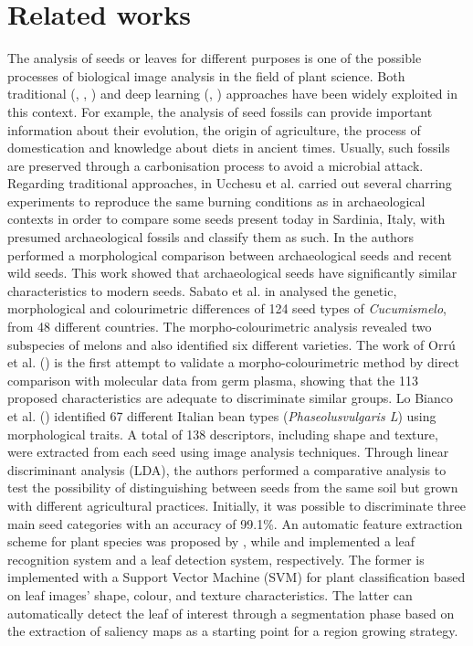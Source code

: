 \documentclass[twocolumn]{svjour3}           %
\begin{document}
\section{Related works}
\label{sec:related}
The analysis of seeds or leaves for different purposes is one of the possible processes of biological image analysis in the field of plant science. Both traditional (\cite{Campanile19}, \cite{DiRub2014}, \cite{Put16}) and deep learning (\cite{Zhang2019}, \cite{Loddo2021}) approaches have been widely exploited in this context. For example, the analysis of seed fossils can provide important information about their evolution, the origin of agriculture, the process of domestication and knowledge about diets in ancient times. Usually, such fossils are preserved through a carbonisation process to avoid a microbial attack.
Regarding traditional approaches, in \cite{Ucc2016} Ucchesu et al. carried out several charring experiments to reproduce the same burning conditions as in archaeological contexts in order to compare some seeds present today in Sardinia, Italy, with presumed archaeological fossils and classify them as such.
In \cite{Ucc2015} the authors performed a morphological comparison between archaeological seeds and recent wild seeds. This work showed that archaeological seeds have significantly similar characteristics to modern seeds. Sabato et al. in \cite{Sabato2015} analysed the genetic, morphological and colourimetric differences of 124 seed types of \emph{Cucumismelo}, from 48 different countries. The morpho-colourimetric analysis revealed two subspecies of melons and also identified six different varieties. The work of Orr\'u et al. (\cite{Orru2012}) is the first attempt to validate a morpho-colourimetric method by direct comparison with molecular data from germ plasma, showing that the 113 proposed characteristics are adequate to discriminate similar groups. Lo Bianco et al. (\cite{LoBianco2015}) identified 67 different Italian bean types (\emph{Phaseolusvulgaris L}) using morphological traits. A total of 138 descriptors, including shape and texture, were extracted from each seed using image analysis techniques. Through linear discriminant analysis (LDA), the authors performed a comparative analysis to test the possibility of distinguishing between seeds from the same soil but grown with different agricultural practices. Initially, it was possible to discriminate three main seed categories with an accuracy of 99.1\%. An automatic feature extraction scheme for plant species was proposed by \cite{Campanile19}, while \cite{DiRub2014} and \cite{Put16} implemented a leaf recognition system and a leaf detection system, respectively. The former is implemented with a Support Vector Machine (SVM) for plant classification based on leaf images' shape, colour, and texture characteristics. The latter can automatically detect the leaf of interest through a segmentation phase based on the extraction of saliency maps as a starting point for a region growing strategy. 
\end{document}
